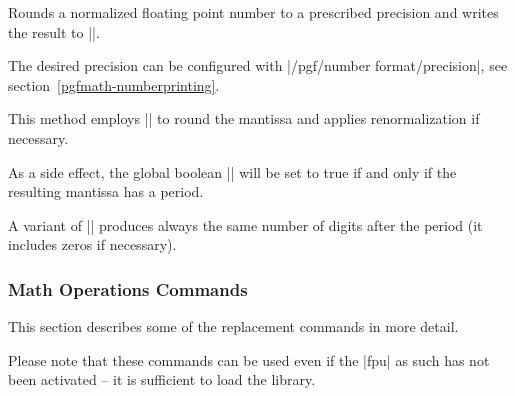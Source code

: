 \begin{command}{}
  Rounds a normalized floating point number to a prescribed precision
  and writes the result to |\pgfmathresult|. 

  The desired precision can be configured with
  |/pgf/number format/precision|, see
  section~\ref{pgfmath-numberprinting}.  
	
  This method employs |\pgfmathroundto| to round the mantissa and
  applies renormalization if necessary. 

  As a side effect, the global boolean |\ifpgfmathfloatroundhasperiod|
  will be set to true if and only if the resulting mantissa has a
  period. 
\begin{codeexample}[]
\pgfmathfloatround{\pgfmathresult}
\pgfmathfloattosci{\pgfmathresult}
\pgfmathresult
\end{codeexample}
\begin{codeexample}[]
\pgfmathfloatround{\pgfmathresult}
\pgfmathfloattosci{\pgfmathresult}
\pgfmathresult
\end{codeexample}
\end{command}

\begin{command}{}
  A variant of |\pgfmathfloatround| produces always the same number of
  digits after the period (it includes zeros if necessary). 
\begin{codeexample}[]
\pgfmathfloatroundzerofill{\pgfmathresult}
\pgfmathfloattosci{\pgfmathresult}
\pgfmathresult
\end{codeexample}
\begin{codeexample}[]
\pgfmathfloatroundzerofill{\pgfmathresult}
\pgfmathfloattosci{\pgfmathresult}
\pgfmathresult
\end{codeexample}
\end{command}



\subsubsection{Math Operations Commands}

This section describes some of the replacement commands in more
detail. 

Please note that these commands can be used even if the |fpu| as such
has not been activated -- it is sufficient to load the library. 

